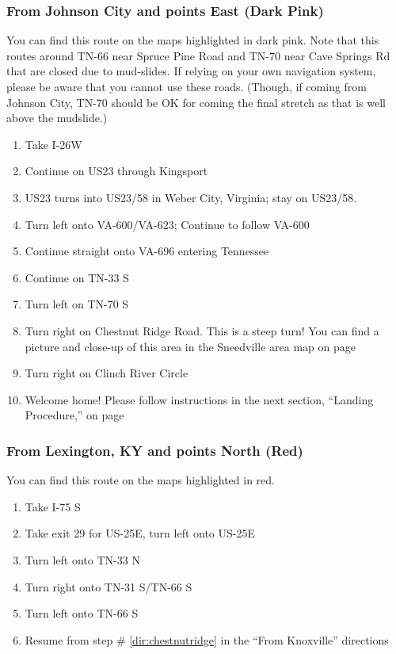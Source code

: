 \subsubsection*{From Johnson City and points East (Dark Pink)}
You can find this route on the maps highlighted in dark pink.  Note that this routes around TN-66 near Spruce Pine Road and TN-70 near Cave Springs Rd that are closed due to mud-slides.  If relying on your own navigation system, please be aware that you cannot use these roads.  (Though, if coming from Johnson City, TN-70 should be OK for coming the final stretch as that is well above the mudslide.)

\begin{enumerate}[noitemsep]
	\item Take I-26W
    \item Continue on US23 through Kingsport
    \item US23 turns into US23/58 in Weber City, Virginia; stay on US23/58.
    \item Turn left onto VA-600/VA-623; Continue to follow VA-600
    \item Continue straight onto VA-696 entering Tennessee
    \item Continue on TN-33 S
    \item Turn left on TN-70 S
    \item Turn right on Chestnut Ridge Road. This is a steep turn! You can find a picture and close-up of this area in the Sneedville area map on page \pageref{image:sneedville}
    \item Turn right on Clinch River Circle
    \item Welcome home!  Please follow instructions in the next section, ``Landing Procedure,'' on page \pageref{sec:parking}
\end{enumerate}


\subsubsection*{From Lexington, KY and points North (Red)}
You can find this route on the maps highlighted in red.

\begin{enumerate}[noitemsep]
	\item Take I-75 S
    \item Take exit 29 for US-25E, turn left onto US-25E
    \item Turn left onto TN-33 N
    \item Turn right onto TN-31 S/TN-66 S
    \item Turn left onto TN-66 S
    \item Resume from step \# \ref{dir:chestnutridge} in the ``From Knoxville'' directions
\end{enumerate}

